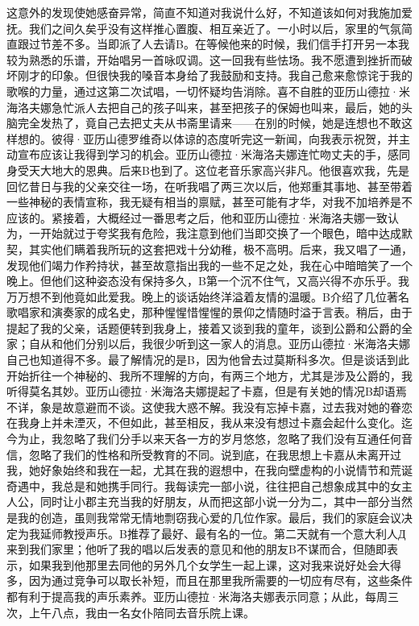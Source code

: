 \documentclass[12pt, UTF8]{ctexbook}
\begin{document}
\par 这意外的发现使她感奋异常，简直不知道对我说什么好，不知道该如何对我施加爱抚。我们之间久矣乎没有这样推心置腹、相互亲近了。一小时以后，家里的气氛简直跟过节差不多。当即派了人去请B。在等候他来的时候，我们信手打开另一本我较为熟悉的乐谱，开始唱另一首咏叹调。这一回我有些怯场。我不愿遭到挫折而破坏刚才的印象。但很快我的嗓音本身给了我鼓励和支持。我自己愈来愈惊诧于我的歌喉的力量，通过这第二次试唱，一切怀疑均告消除。喜不自胜的亚历山德拉·米海洛夫娜急忙派人去把自己的孩子叫来，甚至把孩子的保姆也叫来，最后，她的头脑完全发热了，竟自己去把丈夫从书斋里请来——在别的时候，她是连想也不敢这样想的。彼得·亚历山德罗维奇以体谅的态度听完这一新闻，向我表示祝贺，并主动宣布应该让我得到学习的机会。亚历山德拉·米海洛夫娜连忙吻丈夫的手，感同身受天大地大的恩典。后来B也到了。这位老音乐家高兴非凡。他很喜欢我，先是回忆昔日与我的父亲交往一场，在听我唱了两三次以后，他郑重其事地、甚至带着一些神秘的表情宣称，我无疑有相当的禀赋，甚至可能有才华，对我不加培养是不应该的。紧接着，大概经过一番思考之后，他和亚历山德拉·米海洛夫娜一致认为，一开始就过于夸奖我有危险，我注意到他们当即交换了一个眼色，暗中达成默契，其实他们瞒着我所玩的这套把戏十分幼稚，极不高明。后来，我又唱了一通，发现他们竭力作矜持状，甚至故意指出我的一些不足之处，我在心中暗暗笑了一个晚上。但他们这种姿态没有保持多久，B第一个沉不住气，又高兴得不亦乐乎。我万万想不到他竟如此爱我。晚上的谈话始终洋溢着友情的温暖。B介绍了几位著名歌唱家和演奏家的成名史，那种惺惺惜惺惺的景仰之情随时溢于言表。稍后，由于提起了我的父亲，话题便转到我身上，接着又谈到我的童年，谈到公爵和公爵的全家；自从和他们分别以后，我很少听到这一家人的消息。亚历山德拉·米海洛夫娜自己也知道得不多。最了解情况的是B，因为他曾去过莫斯科多次。但是谈话到此开始折往一个神秘的、我所不理解的方向，有两三个地方，尤其是涉及公爵的，我听得莫名其妙。亚历山德拉·米海洛夫娜提起了卡嘉，但是有关她的情况B却语焉不详，象是故意避而不谈。这使我大惑不解。我没有忘掉卡嘉，过去我对她的眷恋在我身上并未湮灭，不但如此，甚至相反，我从来没有想过卡嘉会起什么变化。迄今为止，我忽略了我们分手以来天各一方的岁月悠悠，忽略了我们没有互通任何音信，忽略了我们的性格和所受教育的不同。说到底，在我思想上卡嘉从未离开过我，她好象始终和我在一起，尤其在我的遐想中，在我向壁虚构的小说情节和荒诞奇遇中，我总是和她携手同行。我每读完一部小说，往往把自己想象成其中的女主人公，同时让小郡主充当我的好朋友，从而把这部小说一分为二，其中一部分当然是我的创造，虽则我常常无情地剽窃我心爱的几位作家。最后，我们的家庭会议决定为我延师教授声乐。B推荐了最好、最有名的一位。第二天就有一个意大利人Д来到我们家里；他听了我的唱以后发表的意见和他的朋友B不谋而合，但随即表示，如果我到他那里去同他的另外几个女学生一起上课，这对我来说好处会大得多，因为通过竞争可以取长补短，而且在那里我所需要的一切应有尽有，这些条件都有利于提高我的声乐素养。亚历山德拉·米海洛夫娜表示同意；从此，每周三次，上午八点，我由一名女仆陪同去音乐院上课。
\end{document}

